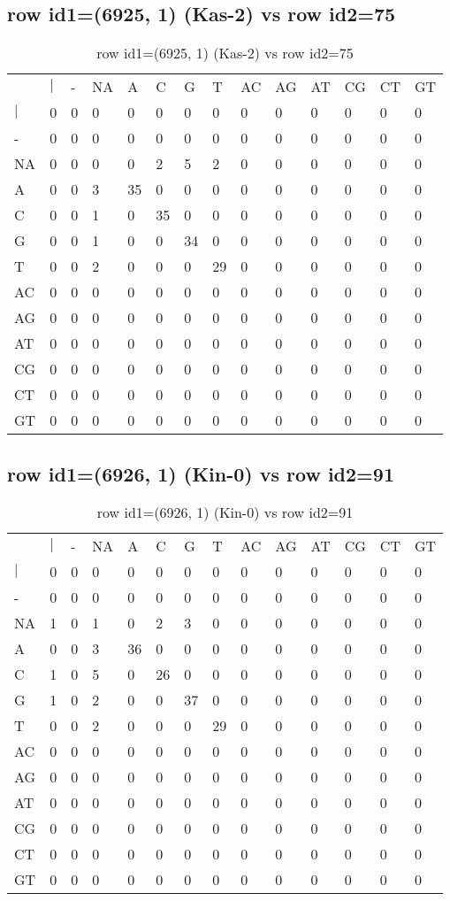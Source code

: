 \subsection{row id1=(6925, 1) (Kas-2) vs row id2=75}
\begin{center}
\begin{longtable}{|l|l|l|l|l|l|l|l|l|l|l|l|l|l|}
\caption{row id1=(6925, 1) (Kas-2) vs row id2=75} \label{table_dm112}\\
\hline
\\
\hline
&$|$&-&NA&A&C&G&T&AC&AG&AT&CG&CT&GT\\
$|$&0&0&0&0&0&0&0&0&0&0&0&0&0\\
-&0&0&0&0&0&0&0&0&0&0&0&0&0\\
NA&0&0&0&0&2&5&2&0&0&0&0&0&0\\
A&0&0&3&35&0&0&0&0&0&0&0&0&0\\
C&0&0&1&0&35&0&0&0&0&0&0&0&0\\
G&0&0&1&0&0&34&0&0&0&0&0&0&0\\
T&0&0&2&0&0&0&29&0&0&0&0&0&0\\
AC&0&0&0&0&0&0&0&0&0&0&0&0&0\\
AG&0&0&0&0&0&0&0&0&0&0&0&0&0\\
AT&0&0&0&0&0&0&0&0&0&0&0&0&0\\
CG&0&0&0&0&0&0&0&0&0&0&0&0&0\\
CT&0&0&0&0&0&0&0&0&0&0&0&0&0\\
GT&0&0&0&0&0&0&0&0&0&0&0&0&0\\
\hline
\end{longtable}
\end{center}

\subsection{row id1=(6926, 1) (Kin-0) vs row id2=91}
\begin{center}
\begin{longtable}{|l|l|l|l|l|l|l|l|l|l|l|l|l|l|}
\caption{row id1=(6926, 1) (Kin-0) vs row id2=91} \label{table_dm114}\\
\hline
\\
\hline
&$|$&-&NA&A&C&G&T&AC&AG&AT&CG&CT&GT\\
$|$&0&0&0&0&0&0&0&0&0&0&0&0&0\\
-&0&0&0&0&0&0&0&0&0&0&0&0&0\\
NA&1&0&1&0&2&3&0&0&0&0&0&0&0\\
A&0&0&3&36&0&0&0&0&0&0&0&0&0\\
C&1&0&5&0&26&0&0&0&0&0&0&0&0\\
G&1&0&2&0&0&37&0&0&0&0&0&0&0\\
T&0&0&2&0&0&0&29&0&0&0&0&0&0\\
AC&0&0&0&0&0&0&0&0&0&0&0&0&0\\
AG&0&0&0&0&0&0&0&0&0&0&0&0&0\\
AT&0&0&0&0&0&0&0&0&0&0&0&0&0\\
CG&0&0&0&0&0&0&0&0&0&0&0&0&0\\
CT&0&0&0&0&0&0&0&0&0&0&0&0&0\\
GT&0&0&0&0&0&0&0&0&0&0&0&0&0\\
\hline
\end{longtable}
\end{center}

